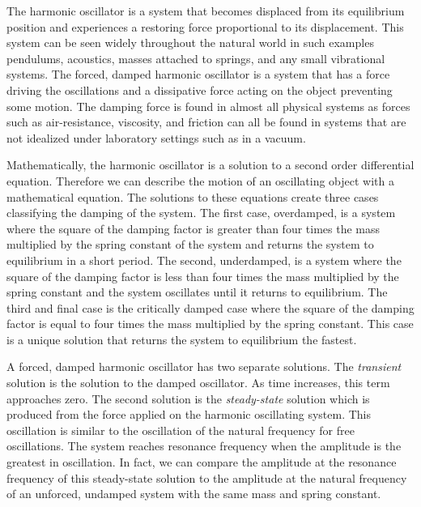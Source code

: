 \par The harmonic oscillator is a system that becomes displaced from its equilibrium position and experiences a restoring force proportional to its displacement. This system can be seen widely throughout the natural world in such examples pendulums, acoustics, masses attached to springs, and any small vibrational systems.\cite{Blinder} The forced, damped harmonic oscillator is a system that has a force driving the oscillations and a dissipative force acting on the object preventing some motion. The damping force is found in almost all physical systems as forces such as air-resistance, viscosity, and friction can all be found in systems that are not idealized under laboratory settings such as in a vacuum. 

\par Mathematically, the harmonic oscillator is a solution to a second order differential equation. Therefore we can describe the motion of an oscillating object with a mathematical equation. The solutions to these equations create three cases classifying the damping of the system. The first case, overdamped, is a system where the square of the damping factor is greater than four times the mass multiplied by the spring constant of the system and returns the system to equilibrium in a short period. The second, underdamped, is a system where the square of the damping factor is less than four times the mass multiplied by the spring constant and the system oscillates until it returns to equilibrium. The third and final case is the critically damped case where the square of the damping factor is equal to four times the mass multiplied by the spring constant. This case is a unique solution that returns the system to equilibrium the fastest.\cite{Meth}

\par A forced, damped harmonic oscillator has two separate solutions. The \textit{transient} solution is the solution to the damped oscillator. As time increases, this term approaches zero. The second solution is the \textit{steady-state} solution which is produced from the force applied on the harmonic oscillating system. This oscillation is similar to the oscillation of the natural frequency for free oscillations. The system reaches resonance frequency when the amplitude is the greatest in oscillation. In fact, we can compare the amplitude at the resonance frequency of this steady-state solution to the amplitude at the natural frequency of an unforced, undamped system with the same mass and spring constant. 

